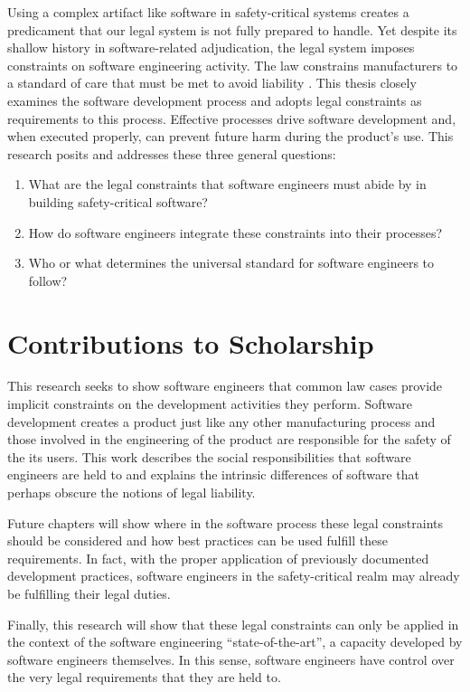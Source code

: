 \documentclass[12pt]{report}
\begin{document}
Using a complex artifact like software in safety-critical systems creates a predicament that our legal system is not fully prepared to handle. Yet despite its shallow history in software-related adjudication, the legal system imposes constraints on software engineering activity. The law constrains manufacturers to a standard of care that must be met to avoid liability \cite{FAKE}. This thesis closely examines the software development process and adopts legal constraints as requirements to this process. Effective processes drive software development and, when executed properly, can prevent future harm during the product's use. This research posits and addresses these three general questions: \singlespace  
\begin{enumerate}  
\item What are the legal constraints that software engineers must abide by in building safety-critical software?  
\item How do software engineers integrate these constraints into their processes?  
\item Who or what determines the universal standard for software engineers to follow?  
\end{enumerate}\doublespace  

\section{Contributions to Scholarship}  

This research seeks to show software engineers that common law cases provide implicit constraints on the development activities they perform. Software development  creates a product just like any other manufacturing process and those involved in the engineering of the product are responsible for the safety of the its users. This work describes the social responsibilities that software engineers are held to and explains the intrinsic differences of software that perhaps obscure the notions of legal liability. 

Future chapters will show where in the software process these legal constraints should be considered and how best practices can be used fulfill these requirements. In fact, with the proper application of previously documented development practices, software engineers in the safety-critical realm may already be fulfilling their legal duties. 

Finally, this research will show that these legal constraints can only be applied in the context of the software engineering ``state-of-the-art'', a capacity developed by software engineers themselves. In this sense, software engineers have control over the very legal requirements that they are held to. 
\end{document}
